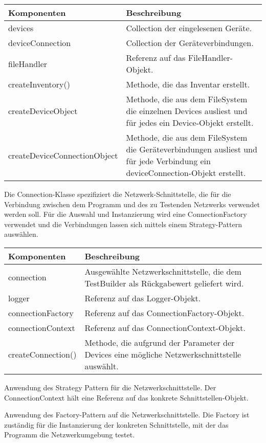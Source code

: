 \documentclass[]{subfiles}
\begin{document}
	\begin{tabularx}{\textwidth}{lX}
		\toprule
			Komponenten & Beschreibung \\
		\midrule
			devices & Collection der eingelesenen Geräte.\\
			deviceConnection & Collection der Geräteverbindungen. \\
			fileHandler & Referenz auf das FileHandler-Objekt.\\
		\midrule
			createInventory() & Methode, die das Inventar erstellt. \\
			createDeviceObject & Methode, die aus dem FileSystem die einzelnen Devices ausliest und für jedes ein Device-Objekt erstellt. \\
			createDeviceConnectionObject & Methode, die aus dem FileSystem die Geräteverbindungen ausliest und für jede Verbindung ein deviceConnection-Objekt erstellt.\\
		\bottomrule
	\end{tabularx}
	\newpage

	Die Connection-Klasse spezifiziert die Netzwerk-Schnittstelle, die für die Verbindung zwischen dem Programm und des zu Testenden Netzwerks verwendet werden soll.
	Für die Auswahl und Instanzierung wird eine ConnectionFactory verwendet und die Verbindungen lassen sich mittels einem Strategy-Pattern auswählen.

	\begin{tabularx}{\textwidth}{lX}
		\toprule
			Komponenten & Beschreibung \\
		\midrule
			connection & Ausgewählte Netzwerkschnittstelle, die dem TestBuilder als Rückgabewert geliefert wird. \\
			logger & Referenz auf das Logger-Objekt. \\
			connectionFactory & Referenz auf das ConnectionFactory-Objekt. \\
			connectionContext & Referenz auf das ConnectionContext-Objekt. \\
		\midrule
			createConnection() & Methode, die aufgrund der Parameter der Devices eine mögliche Netzwerkschnittstelle auswählt.\\
		\bottomrule
	\end{tabularx}

	Anwendung des Strategy Pattern für die Netzwerkschnittstelle. 
	Der ConnectionContext hält eine Referenz auf das konkrete Schnittstellen-Objekt.

	Anwendung des Factory-Pattern auf die Netzwerkschnittstelle.
	Die Factory ist zuständig für die Instanzierung der konkreten Schnittstelle, mit der das Programm die Netzwerkumgebung testet.
\end{document}
